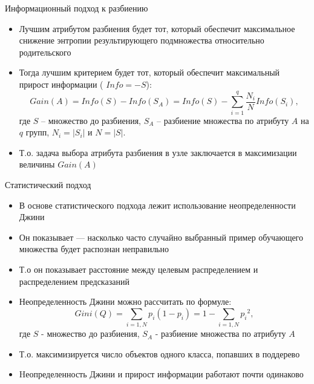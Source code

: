 \documentclass{beamer}
\begin{document}
\begin{frame}{Информационный подход к разбиению}
    \small

    \begin{itemize}
        \item Лучшим атрибутом разбиения будет тот, который обеспечит максимальное снижение энтропии результирующего подмножества относительно родительского
        \item Тогда лучшим критерием будет тот, который обеспечит максимальный прирост информации ( $Info = -S$):
        \begin{equation}
          Gain(A) = Info(S) - Info(S_A) = Info(S) - \sum_{i=1}^q \frac{N_{i}}{ N } Info(S_i),
        \end{equation}
        где $S$ -- множество до разбиения, $S_A$ -- разбиение множества по атрибуту $A$ на $q$ групп, $N_i = |S_i|$ и $N = |S|$.
        \item Т.о. задача выбора атрибута разбиения в узле заключается в максимизации величины $Gain(A)$
    \end{itemize}
\end{frame}


\begin{frame}{Статистический подход}
    \small

    \begin{itemize}
        \item В основе статистического подхода лежит использование неопределенности Джини
        \item Он показывает — насколько часто случайно выбранный пример обучающего множества будет распознан неправильно
        \item Т.о он показывает расстояние между целевым распределением и распределением предсказаний
        \item  Неопределенность Джини можно рассчитать по формуле:
        \begin{equation}
          Gini(Q) = \sum_{i=1, N} p_i (1 - p_i) = 1 - \sum_{i=1, N}{p_i}^2,
        \end{equation}
        где $S$ - множество до разбиения, $S_A$ - разбиение множества по атрибуту $A$
        \item Т.о. максимизируется число объектов одного класса, попавших в поддерево
        \item Hеопределенность Джини и прирост информации работают почти одинаково
    \end{itemize}
\end{frame}
\end{document}
